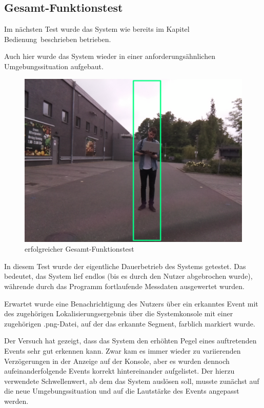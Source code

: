 \subsection{Gesamt-Funktionstest}

Im nächsten Test wurde das System wie bereits im Kapitel \glqq Bedienung\grqq\ beschrieben betrieben. 

Auch hier wurde das System wieder in einer anforderungsähnlichen Umgebungssituation aufgebaut.

\begin{figure}[h]
	\begin{center}
		\includegraphics[scale=0.1]{Sections/Tests/Test_7}
	\end{center}
	\caption{erfolgreicher Gesamt-Funktionstest}
	\label{fig:Test_7}
\end{figure}

In diesem Test wurde der eigentliche Dauerbetrieb des Systems getestet. Das bedeutet, das System lief endlos (bis es durch den Nutzer abgebrochen wurde), währende durch das Programm fortlaufende Messdaten ausgewertet wurden. 

Erwartet wurde eine Benachrichtigung des Nutzers über ein erkanntes Event mit des zugehörigen Lokalisierungsergebnis über die Systemkonsole mit einer zugehörigen .png-Datei, auf der das erkannte Segment, farblich markiert wurde.

Der Versuch hat gezeigt, dass das System den erhöhten Pegel eines auftretenden Events sehr gut erkennen kann. Zwar kam es immer wieder zu variierenden Verzögerungen in der Anzeige auf der Konsole, aber es wurden dennoch aufeinanderfolgende Events korrekt hintereinander aufgelistet. Der hierzu verwendete Schwellenwert, ab dem das System auslösen soll, musste zunächst auf die neue Umgebungssituation und auf die Lautstärke des Events angepasst werden. 

